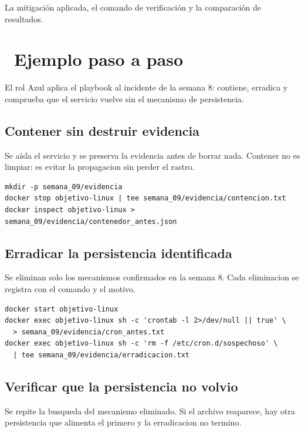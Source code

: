 \documentclass[11pt,a4paper]{article}
\newcommand{\iconotexto}[2]{\textcolor{cyanNeon}{\faIcon{#1}}~#2}
\begin{document}
La mitigación aplicada, el comando de verificación y la comparación de resultados.

\section{\iconotexto{list-ol}{Ejemplo paso a paso}}

El rol Azul aplica el playbook al incidente de la semana 8: contiene, erradica y comprueba que el servicio vuelve sin el mecanismo de persistencia.

\subsection{Contener sin destruir evidencia}

Se aísla el servicio y se preserva la evidencia antes de borrar nada. Contener no es limpiar: es evitar la propagacion sin perder el rastro.

\begin{lstlisting}[style=estiloCodigo]
mkdir -p semana_09/evidencia
docker stop objetivo-linux | tee semana_09/evidencia/contencion.txt
docker inspect objetivo-linux > semana_09/evidencia/contenedor_antes.json
\end{lstlisting}

\subsection{Erradicar la persistencia identificada}

Se eliminan solo los mecanismos confirmados en la semana 8. Cada eliminacion se registra con el comando y el motivo.

\begin{lstlisting}[style=estiloCodigo]
docker start objetivo-linux
docker exec objetivo-linux sh -c 'crontab -l 2>/dev/null || true' \
  > semana_09/evidencia/cron_antes.txt
docker exec objetivo-linux sh -c 'rm -f /etc/cron.d/sospechoso' \
  | tee semana_09/evidencia/erradicacion.txt
\end{lstlisting}

\subsection{Verificar que la persistencia no volvio}

Se repite la busqueda del mecanismo eliminado. Si el archivo reaparece, hay otra persistencia que alimenta el primero y la erradicacion no termino.
\end{document}
